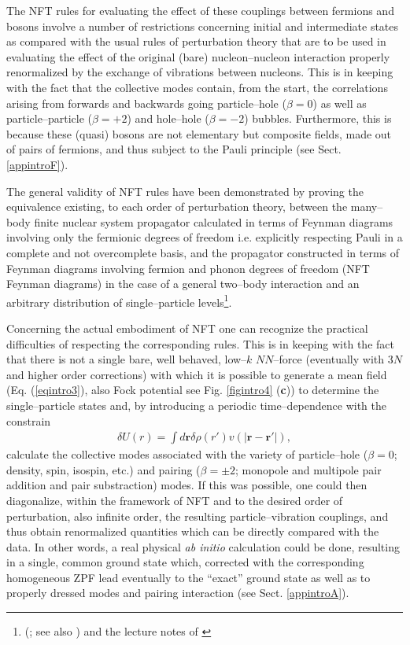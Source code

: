The NFT rules  for evaluating the effect of these couplings between fermions and bosons involve a number of restrictions concerning initial and intermediate states as compared with the usual rules of perturbation theory that are to be used in evaluating the effect of the original (bare) nucleon--nucleon interaction properly renormalized by  the exchange of vibrations between nucleons. This is in keeping with the fact that the collective modes contain, from the start,  the correlations arising from forwards and backwards going  particle--hole ($\beta=0$) as well as particle--particle ($\beta=+2$) and hole--hole ($\beta=-2$) bubbles. Furthermore, this is because these (quasi) bosons are not elementary but composite fields, made out of pairs of fermions, and thus subject to the Pauli principle (see Sect. \ref{appintroF}). 
 

The general validity of NFT rules have been demonstrated by proving the equivalence existing, to each order of perturbation theory, between the many--body finite nuclear system propagator calculated in terms of Feynman diagrams involving only the fermionic degrees of freedom i.e. explicitly respecting Pauli in a complete and not overcomplete basis, and the propagator constructed in terms of Feynman diagrams involving fermion and phonon degrees of freedom (NFT Feynman diagrams) in the case of a general two--body interaction and an arbitrary distribution of single--particle levels\footnote{(\cite{Bes:75}; see also \cite{Baranger:69}) and the  lecture notes of  \cite{McFarlane:69}}.



 Concerning the actual embodiment of NFT one can recognize the practical difficulties of respecting the corresponding rules. This is in keeping with the fact that there is not a single bare, well behaved, low--$k$ $NN$--force (eventually with 3$N$ and higher order corrections) with which it is possible to generate a mean field (Eq. (\ref{eqintro3}), also Fock potential see Fig. \ref{figintro4} (\textbf{c})) to determine the single--particle states and, by introducing a periodic time--dependence with the constrain
\begin{align}\label{eq1.5.1}
\delta U(r)=\int d\mathbf{r} \delta \rho(r') v(|\mathbf r- \mathbf r'|),
\end{align}
calculate the collective modes associated with the variety of particle--hole ($\beta=0$; density, spin, isospin, etc.) and pairing ($\beta=\pm2$; monopole and multipole pair addition and pair substraction) modes. If this was possible, one could then diagonalize, within the framework of NFT and to the desired order of perturbation, also infinite order, the resulting particle--vibration couplings, and thus obtain renormalized quantities which can be directly compared with the data.
 In other words, a real physical \textit{ab initio} calculation could be done, resulting in a single,  common ground state which, corrected with the corresponding homogeneous ZPF lead eventually to the ``exact'' ground state as well as to properly dressed modes and pairing interaction  (see Sect. \ref{appintroA}).



